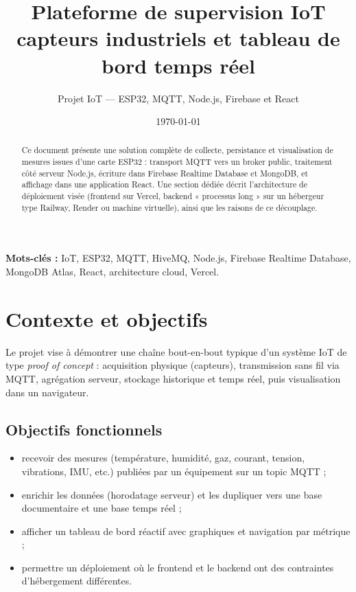 \documentclass[11pt,a4paper]{article}
\title{\textbf{Plateforme de supervision IoT\\capteurs industriels et tableau de bord temps réel}}
\author{Projet IoT — ESP32, MQTT, Node.js, Firebase et React}
\date{\today}
\begin{document}
\maketitle
\thispagestyle{empty}

\begin{abstract}
\noindent
Ce document présente une solution complète de collecte, persistance et visualisation de mesures issues d'une carte ESP32 : transport MQTT vers un broker public, traitement côté serveur Node.js, écriture dans Firebase Realtime Database et MongoDB, et affichage dans une application React. Une section dédiée décrit l'architecture de déploiement visée (frontend sur Vercel, backend « processus long » sur un hébergeur type Railway, Render ou machine virtuelle), ainsi que les raisons de ce découplage.
\end{abstract}

\vspace{1em}
\noindent\textbf{Mots-clés :} IoT, ESP32, MQTT, HiveMQ, Node.js, Firebase Realtime Database, MongoDB Atlas, React, architecture cloud, Vercel.

\tableofcontents
\newpage

\section{Contexte et objectifs}

Le projet vise à démontrer une chaîne bout-en-bout typique d'un système IoT de type \emph{proof of concept} : acquisition physique (capteurs), transmission sans fil via MQTT, agrégation serveur, stockage historique et temps réel, puis visualisation dans un navigateur.

\subsection{Objectifs fonctionnels}
\begin{itemize}[leftmargin=*]
  \item recevoir des mesures (température, humidité, gaz, courant, tension, vibrations, IMU, etc.) publiées par un équipement sur un topic MQTT ;
  \item enrichir les données (horodatage serveur) et les dupliquer vers une base documentaire et une base temps réel ;
  \item afficher un tableau de bord réactif avec graphiques et navigation par métrique ;
  \item permettre un déploiement où le frontend et le backend ont des contraintes d'hébergement différentes.
\end{itemize}
\end{document}
